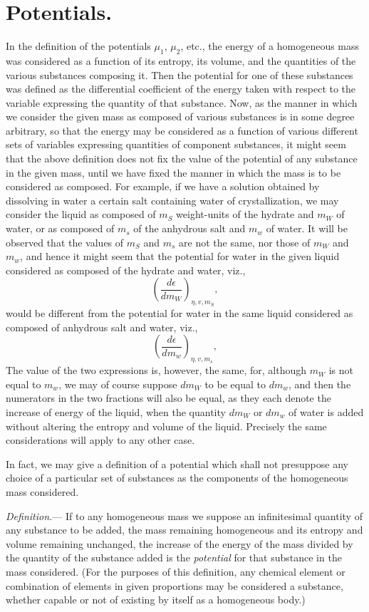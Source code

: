 \documentclass[12pt]{memoir}
\begin{document}
\section{Potentials.}
In the definition of the potentials $\mu_1$, $\mu_2$, etc., the energy of a homogeneous mass was considered as a function of its entropy, its volume, and the quantities of the various substances composing it. Then the potential for one of these substances was defined as the differential coefficient of the energy taken with respect to the variable expressing the quantity of that substance. Now, as the manner in which we consider the given mass as composed of various substances is in some degree arbitrary, so that the energy may be considered as a function of various different sets of variables expressing quantities of component substances, it might seem that the above definition does not fix the value of the potential of any substance in the given mass, until we have fixed the manner in which the mass is to be considered as composed. For example, if we have a solution obtained by dissolving in water a certain salt containing water of crystallization, we may consider the liquid as composed of $m_S$ weight-units of the hydrate and $m_W$ of water, or as composed of $m_s$ of the anhydrous salt and $m_w$ of water. It will be observed that the values of $m_S$ and
$m_s$ are not the same, nor those of $m_W$ and $m_w$, and hence it might seem that the potential for water in the given liquid considered as composed of the hydrate and water, viz.,
$$\left(\frac{d \epsilon}{dm_W}\right)_{\eta,v,m_S},$$
would be different from the potential for water in the same liquid considered as composed of anhydrous salt and water, viz.,
$$\left(\frac{d \epsilon}{dm_w}\right)_{\eta,v,m_s},$$
The value of the two expressions is, however, the same, for, although $m_W$ is not equal to $m_w$, we may of course suppose $dm_W$ to be equal to $dm_w$, and then the numerators in the two fractions will also be equal, as they each denote the increase of energy of the liquid, when the quantity $dm_W$ or $dm_w$ of water is added without altering the entropy and volume of the liquid. Precisely the same considerations will apply to any other case.


In fact, we may give a definition of a potential which shall not presuppose any choice of a particular set of substances as the components of the homogeneous mass considered.


\textit{Definition.}--- If to any homogeneous mass we suppose an infinitesimal quantity of any substance to be added, the mass remaining homogeneous and its entropy and volume remaining unchanged, the increase of the energy of the mass divided by the quantity of the substance added is the \textit{potential} for that substance in the mass considered. (For the purposes of this definition, any chemical element or combination of elements in given proportions may be considered a substance, whether capable or not of existing by itself as a homogeneous body.)
\end{document}
